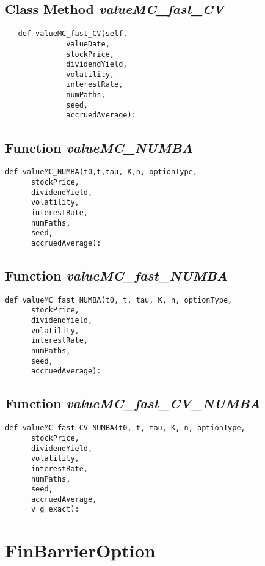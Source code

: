 \documentclass[twoside,11pt]{book}
\begin{document}
\subsection{Class Method {\it valueMC\_fast\_CV}}


\begin{lstlisting}
   def valueMC_fast_CV(self,
              valueDate,
              stockPrice,
              dividendYield,
              volatility,
              interestRate,
              numPaths,
              seed,
              accruedAverage):
\end{lstlisting}

\subsection{Function {\it valueMC\_NUMBA}}


\begin{lstlisting}
def valueMC_NUMBA(t0,t,tau, K,n, optionType,
      stockPrice,
      dividendYield,
      volatility,
      interestRate,
      numPaths,
      seed,
      accruedAverage):
\end{lstlisting}

\subsection{Function {\it valueMC\_fast\_NUMBA}}


\begin{lstlisting}
def valueMC_fast_NUMBA(t0, t, tau, K, n, optionType,
      stockPrice,
      dividendYield,
      volatility,
      interestRate,
      numPaths,
      seed,
      accruedAverage):
\end{lstlisting}

\subsection{Function {\it valueMC\_fast\_CV\_NUMBA}}


\begin{lstlisting}
def valueMC_fast_CV_NUMBA(t0, t, tau, K, n, optionType,
      stockPrice,
      dividendYield,
      volatility,
      interestRate,
      numPaths,
      seed,
      accruedAverage, 
      v_g_exact):
\end{lstlisting}

\newpage
\section{FinBarrierOption}
\end{document}
